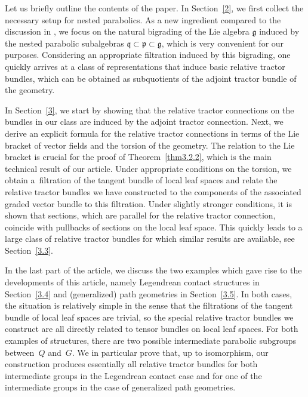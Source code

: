 \documentclass[pdftex]{sigma}
\numberwithin{equation}{section}
\def\frak{\mathfrak}
\begin{document}
Let us briefly outline the contents of the paper. In Section~\ref{2}, we first collect the
necessary setup for nested parabolics. As a new ingredient compared to the discussion
in \cite{Rel-BGG1,Rel-BGG2}, we focus on the natural bigrading of the Lie algebra
$\frak g$ induced by the nested parabolic subalgebras $\frak q\subset\frak
p\subset\frak g$, which is very convenient for our purposes. Considering an
appropriate filtration induced by this bigrading, one quickly arrives at a class of
representations that induce basic relative tractor bundles, which can be obtained as
subquotients of the adjoint tractor bundle of the geometry.

In Section~\ref{3}, we start by showing that the relative tractor connections on the
bundles in our class are induced by the adjoint tractor connection. Next, we derive an
explicit formula for the relative tractor connections in terms of the Lie bracket of
vector fields and the torsion of the geometry. The relation to the Lie bracket is
crucial for the proof of Theorem~\ref{thm3.2.2}, which is the main technical result
of our article. Under appropriate conditions on the torsion, we obtain a~filtration
of the tangent bundle of local leaf spaces and relate the relative tractor bundles we
have constructed to the components of the associated graded vector bundle to this
filtration. Under slightly stronger conditions, it is shown that sections, which are
parallel for the relative tractor connection, coincide with pullbacks of sections on
the local leaf space. This quickly leads to a large class of relative tractor bundles
for which similar results are available, see Section~\ref{3.3}.

In the last part of the article, we discuss the two examples which gave rise to the
developments of this article, namely Legendrean contact structures in Section~\ref{3.4}
and (generalized) path geometries in Section~\ref{3.5}. In both cases, the situation is
relatively simple in the sense that the filtrations of the tangent bundle of local
leaf spaces are trivial, so the special relative tractor bundles we construct are all
directly related to tensor bundles on local leaf spaces. For both examples of
structures, there are two possible intermediate parabolic subgroups between~$Q$ and~$G$.
We in particular prove that, up to isomorphism, our construction produces
essentially all relative tractor bundles for both intermediate groups in the
Legendrean contact case and for one of the intermediate groups in the case of
generalized path geometries.
\end{document}
